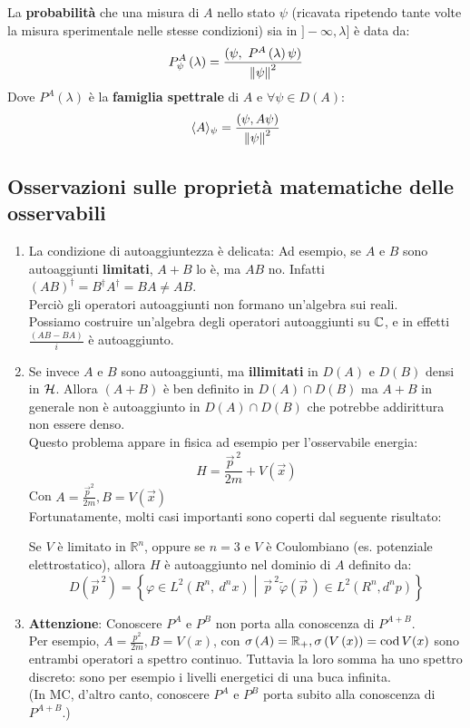 \begin{axi}
La \textbf{probabilità} che una misura di $A$ nello stato $\psi$ (ricavata ripetendo tante volte la misura sperimentale nelle stesse condizioni) sia in $]-\infty , \lambda]$ è data da:
\[
P_\psi^A\left(\lambda\right)=\frac{(\psi,\ P^A\left(\lambda\right)\psi)}{\norm{\psi}^2}
\]
Dove $P^A\left(\lambda\right)$ è la \textbf{famiglia spettrale} di $A$ e $\forall \psi \in D\left(A\right)$:
\[
\langle A \rangle_\psi = \frac{(\psi, A\psi)}{\left\lVert\psi\right\rVert^2}
\]
\end{axi}

\subsection{Osservazioni sulle proprietà matematiche delle osservabili}
\begin{enumerate}
    \item La condizione di autoaggiuntezza è delicata: 
	Ad esempio, se $A$ e $B$ sono autoaggiunti \textbf{limitati}, $A+B$ lo è, ma $AB$ no. Infatti $\left(AB\right)^\dag=B^\dag A^\dag=BA\neq AB$.\\
	Perciò gli operatori autoaggiunti non formano un'algebra sui reali.\\
	Possiamo costruire un'algebra degli operatori autoaggiunti su $\mathbb{C}$, e in effetti $\frac{\left(AB-BA\right)}{i}$ è autoaggiunto.
	\item Se invece $A$ e $B$ sono autoaggiunti, ma \textbf{illimitati} in $D\left(A\right)$ e $D(B)$ densi in $\mathcal{H}$. Allora $(A+B)$ è ben definito in $D\left(A\right)\cap D\left(B\right)$ ma $A+B$ in generale non è autoaggiunto in $D\left(A\right)\cap D\left(B\right)$ che potrebbe addirittura non essere denso.\\
	Questo problema appare in fisica ad esempio per l'osservabile energia:
	\[
	H=\frac{{\vec{p}}^{\,2}}{2m}+V(\vec{x})
	\]
	Con $A=\frac{{\vec{p}}^2}{2m}, B=V(\vec{x})$\\
	Fortunatamente, molti casi importanti sono coperti dal seguente risultato:
	\begin{thm}
	Se $V$ è limitato in $\mathbb{R}^n$, oppure se $n=3$ e $V$ è Coulombiano (es. potenziale elettrostatico), allora $H$ è autoaggiunto nel dominio di $A$ definito da:
	    \[
	    D\left(\vec{p}^{\>2}\right)=\left\{\varphi\in L^2\left(R^n,\ d^nx\right)\middle|\ {\vec{p}}^{\>2}\widetilde{\varphi}\left(\vec{p}\,\right)\in L^2\left(R^n, d^np\right)\right\}
	    \]
	\end{thm}
	\item \textbf{Attenzione}: Conoscere $P^A$ e $P^B$ non porta alla conoscenza di $P^{A+B}$.\\
	Per esempio, $A=\frac{p^2}{2m}, B=V\left(x\right)$, con $\sigma \left(A\right)= \mathbb{R}_+, \sigma \left(V\left(x\right)\right)=\operatorname{cod} V(x)$ sono entrambi operatori a spettro continuo. Tuttavia la loro somma ha uno spettro discreto: sono per esempio i livelli energetici di una buca infinita.\\
	(In MC, d'altro canto, conoscere $P^A$ e $P^B$ porta subito alla conoscenza di $P^{A+B}$.)\\
\end{enumerate}
%